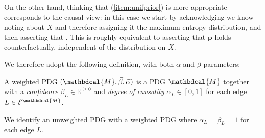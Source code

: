 \documentclass{article}
\theoremstyle{plain}
\theoremstyle{definition}
\theoremstyle{remark}
\newcommand\mat[1]{\mathbf{#1}}
\newcommand{\Ed}{\mathcal E}
\newcommand{\dg}[1]{\mathbdcal{#1}}
\numberwithin{equation}{section}
\begin{document}
{\begin{example}
		
		On the other hand, thinking that (\ref{item:unifprior}) is more appropriate corresponds to the causal view: in this case we start by acknowledging we know noting about $X$ and therefore assigning it the maximum entropy distribution, and then asserting that . This is roughly equivalent to asserting that $\mat p$ holds counterfactually, independent of the distribution on $X$. 
	\end{example}
	
	We therefore adopt the following definition, with both $\alpha$ and $\beta$ parameters:

	\begin{defn}
		A weighted PDG $(\dg M, \vec \beta, \vec \alpha)$ is a PDG
	        $\dg M$ together with a \emph{confidence} $\beta_L \in \mathbb
	        R^{\geq 0}$ and \emph{degree of causality} $\alpha_L \in
	        [0,1]$ for each edge $L \in \Ed^\dg M$. 
	\end{defn}

	We identify an unweighted PDG with a weighted PDG where $\alpha_L
	= \beta_L = 1$ for each edge $L$.
}
\end{document}
